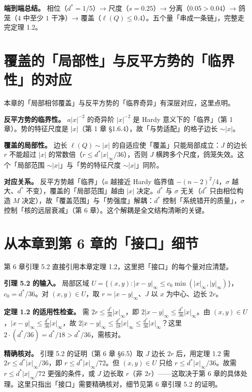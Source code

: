 \documentclass[a4paper,11pt,openany]{ctexbook}
\numberwithin{equation}{chapter}
\numberwithin{figure}{chapter}
\numberwithin{table}{chapter}
\begin{document}
\textbf{端到端总结。} 相位（$d^*=1/5$）→ 尺度（$s=0.25$）→ 分离（$0.05>0.04$）→ 鸽笼（$4$ 中至少 $1$ 干净）→ 覆盖（$\ell(Q)\le0.4$）。五个量「串成一条链」，完整走完定理 1.2。

\section{覆盖的「局部性」与反平方势的「临界性」的对应}

本章的「局部相邻覆盖」与反平方势的「临界奇异」有深层对应，这里点明。

\textbf{反平方势的临界性。} $a|x|^{-2}$ 的奇异阶 $|x|^{-2}$ 是 Hardy 意义下的「临界」（第 1 章）。势的特征尺度是 $|x|$（第 1 章 §1.6.4），故「与势适配」的格子边长 $\sim|x|$。

\textbf{覆盖的局部性。} 边长 $\ell(Q)\sim|x|$ 的自适应使「覆盖」只能局部成立：$J$ 的边长 $r$ 不能超过 $|x|$ 的常数倍（$r\le d^*|x|_\infty/36$），否则 $J$ 横跨多个尺度，鸽笼失效。这个「局部范围 $\sim|x|$」与「势的特征尺度 $\sim|x|$」同阶。

\textbf{对应关系。} 反平方势越「临界」（$a$ 越接近 Hardy 临界值 $-(n-2)^2/4$，$\sigma$ 越大、$d^*$ 不变），覆盖的「局部范围」越由 $|x|$ 决定。$d^*$ 与 $\sigma$ 无关（$d^*$ 只由相位构造 $M$ 决定），故「覆盖范围」与「势强度」解耦：$d^*$ 控制「系统错开的质量」，$\sigma$ 控制「核的远层衰减」（第 6 章）。这个解耦是全文结构清晰的关键。

\section{从本章到第 6 章的「接口」细节}

第 6 章引理 5.2 直接引用本章定理 1.2，这里把「接口」的每个量对应清楚。

\textbf{引理 5.2 的输入。} 局部区域 $U=\{(x,y):|x-y|_\infty\le c_0\min(|x|_\infty,|y|_\infty)\}$，$c_0=d^*/36$。对 $(x,y)\in U$，取 $r=|x-y|_\infty$、$J$ 以 $x$ 为中心、边长 $2r$。

\textbf{定理 1.2 的适用性检查。} 需 $2r\le\frac{d^*}{36}|x|_\infty$，即 $2|x-y|_\infty\le\frac{d^*}{36}|x|_\infty$。由 $(x,y)\in U$，$|x-y|_\infty\le\frac{d^*}{36}|x|_\infty$，故 $2|x-y|_\infty\le\frac{d^*}{18}|x|_\infty\le\frac{d^*}{36}|x|_\infty$？这里 $2\cdot(d^*/36)=d^*/18>d^*/36$，需核对。

\textbf{精确核对。} 引理 5.2 的证明（第 6 章 §6.5）取 $J$ 边长 $2r$ 后，用定理 1.2 需 $2r\le d^*|x|_\infty/36$，即 $r\le d^*|x|_\infty/72$。但 $(x,y)\in U$ 只给 $r\le d^*|x|_\infty/36$。故需 $r\le d^*|x|_\infty/72$ 更强的条件，或 $J$ 边长取 $r$（非 $2r$）——这取决于第 6 章的具体处理。这里只指出「接口」需要精确核对，细节见第 6 章引理 5.2 的证明。
\end{document}
